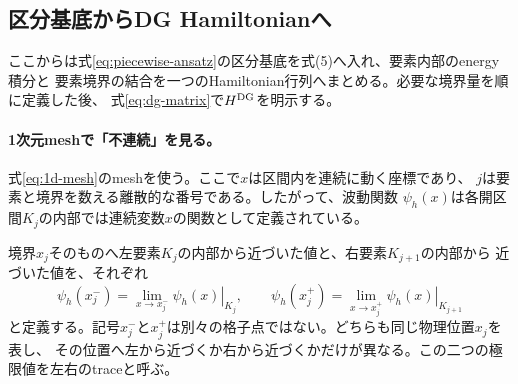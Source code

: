 \documentclass[11pt,a4paper]{article}
\begin{document}
\subsection{区分基底からDG Hamiltonianへ}
ここからは式\eqref{eq:piecewise-ansatz}の区分基底を式(5)へ入れ、要素内部のenergy積分と
要素境界の結合を一つのHamiltonian行列へまとめる。必要な境界量を順に定義した後、
式\eqref{eq:dg-matrix}で$H^{\rm DG}$を明示する。

\paragraph{1次元meshで「不連続」を見る。}
式\eqref{eq:1d-mesh}のmeshを使う。ここで$x$は区間内を連続に動く座標であり、
$j$は要素と境界を数える離散的な番号である。したがって、波動関数
$\psi_h(x)$は各開区間$K_j$の内部では連続変数$x$の関数として定義されている。

境界$x_j$そのものへ左要素$K_j$の内部から近づいた値と、右要素$K_{j+1}$の内部から
近づいた値を、それぞれ
\begin{equation}
 \psi_h(x_j^-)=\lim_{x\to x_j^-}\left.\psi_h(x)\right|_{K_j},
 \qquad
 \psi_h(x_j^+)=\lim_{x\to x_j^+}\left.\psi_h(x)\right|_{K_{j+1}}
 \label{eq:1d-traces}
\end{equation}
と定義する。記号$x_j^-$と$x_j^+$は別々の格子点ではない。どちらも同じ物理位置$x_j$を表し、
その位置へ左から近づくか右から近づくかだけが異なる。この二つの極限値を左右のtraceと呼ぶ。
\end{document}
